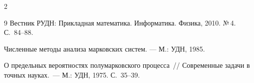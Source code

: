 \begin{multicols}{2}
{{\begin{thebibliography}{9}
Вестник РУДН: Прикладная математика. Информатика. Физика, 2010. №\,4. С.~84--88.





 Численные методы анализа марковских систем. --- М.: УДН, 1985.

 

 \label{end\stat}





 О предельных вероятностях полумарковского процесса~// Современные задачи в точных науках.~--- М.: УДН, 1975. С.~35--39.

 \end{thebibliography}

}

}





\end{multicols}


